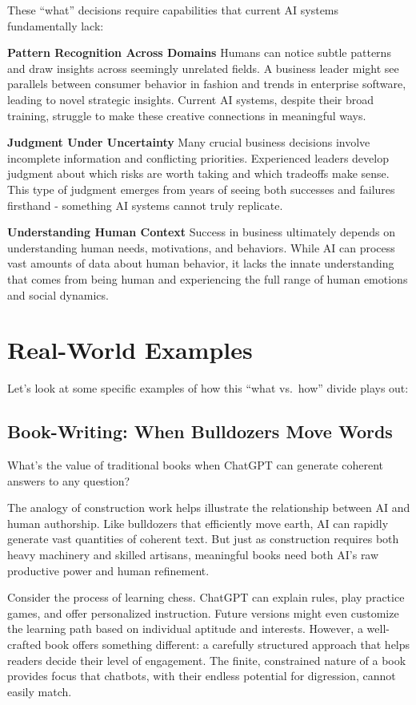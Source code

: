 \documentclass[
  Letterpaper,
]{scrbook}
\begin{document}
These ``what'' decisions require capabilities that current AI systems
fundamentally lack:

\textbf{Pattern Recognition Across Domains} Humans can notice subtle
patterns and draw insights across seemingly unrelated fields. A business
leader might see parallels between consumer behavior in fashion and
trends in enterprise software, leading to novel strategic insights.
Current AI systems, despite their broad training, struggle to make these
creative connections in meaningful ways.

\textbf{Judgment Under Uncertainty} Many crucial business decisions
involve incomplete information and conflicting priorities. Experienced
leaders develop judgment about which risks are worth taking and which
tradeoffs make sense. This type of judgment emerges from years of seeing
both successes and failures firsthand - something AI systems cannot
truly replicate.

\textbf{Understanding Human Context} Success in business ultimately
depends on understanding human needs, motivations, and behaviors. While
AI can process vast amounts of data about human behavior, it lacks the
innate understanding that comes from being human and experiencing the
full range of human emotions and social dynamics.

\section{Real-World Examples}\label{real-world-examples}

Let's look at some specific examples of how this ``what vs.~how'' divide
plays out:

\subsection{Book-Writing: When Bulldozers Move
Words}\label{book-writing-when-bulldozers-move-words}

What's the value of traditional books when ChatGPT can generate coherent
answers to any question?

The analogy of construction work helps illustrate the relationship
between AI and human authorship. Like bulldozers that efficiently move
earth, AI can rapidly generate vast quantities of coherent text. But
just as construction requires both heavy machinery and skilled artisans,
meaningful books need both AI's raw productive power and human
refinement.

Consider the process of learning chess. ChatGPT can explain rules, play
practice games, and offer personalized instruction. Future versions
might even customize the learning path based on individual aptitude and
interests. However, a well-crafted book offers something different: a
carefully structured approach that helps readers decide their level of
engagement. The finite, constrained nature of a book provides focus that
chatbots, with their endless potential for digression, cannot easily
match.
\end{document}
